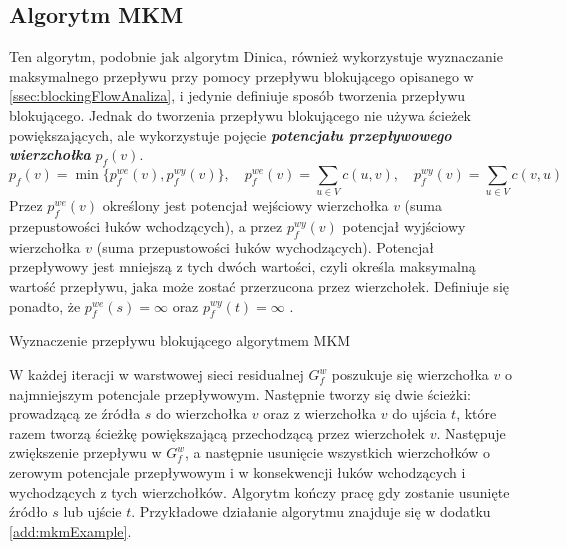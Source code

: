 \subsection{Algorytm MKM}\label{ssec:mkmAnaliza}
Ten algorytm, podobnie jak algorytm Dinica, również wykorzystuje wyznaczanie maksymalnego przepływu przy pomocy przepływu blokującego opisanego w \ref{ssec:blockingFlowAnaliza}, i jedynie definiuje sposób tworzenia przepływu blokującego. Jednak do tworzenia przepływu blokującego nie używa ścieżek powiększających, ale wykorzystuje pojęcie \textit{\textbf{potencjału przepływowego wierzchołka}} $ p_f(v) $.
$$ p_f(v)=\min\{p_f^{we}(v),p_f^{wy}(v)\},\quad p_f^{we}(v)=\sum_{u\in V}{c(u,v)},\quad p_f^{wy}(v)=\sum_{u\in V}{c(v,u)} $$
Przez $ p_f^{we}(v) $ określony jest potencjał wejściowy wierzchołka $ v $ (suma przepustowości łuków wchodzących), a przez $ p_f^{wy}(v) $ potencjał wyjściowy wierzchołka $ v $ (suma przepustowości łuków wychodzących). Potencjał przepływowy jest mniejszą z tych dwóch wartości, czyli określa maksymalną wartość przepływu, jaka może zostać przerzucona przez wierzchołek. Definiuje się ponadto, że $ p_f^{we}(s)=\infty $ oraz $ p_f^{wy}(t)=\infty $  \cite{id:ZaawansowaneAlgorytmyMkm}.
\begin{algorithm}[H]
	\caption{Wyznaczenie przepływu blokującego algorytmem MKM}\label{mkmPseudo}
	\begin{algorithmic}
			\Repeat
			\space{}
		\EndProcedure
	\end{algorithmic}
\end{algorithm}\vfill
W każdej iteracji w warstwowej sieci residualnej $ G_f^w $ poszukuje się wierzchołka $ v $ o najmniejszym potencjale przepływowym. Następnie tworzy się dwie ścieżki: prowadzącą ze źródła $ s $ do wierzchołka $ v $ oraz z wierzchołka $ v $ do ujścia $ t $, które razem tworzą ścieżkę powiększającą przechodzącą przez wierzchołek $ v $. Następuje zwiększenie przepływu w $ G_f^w $, a następnie usunięcie wszystkich wierzchołków o zerowym potencjale przepływowym i w konsekwencji łuków wchodzących i wychodzących z tych wierzchołków. Algorytm kończy pracę gdy zostanie usunięte źródło $ s $ lub ujście $ t $. Przykładowe działanie algorytmu znajduje się w dodatku \ref{add:mkmExample}.

